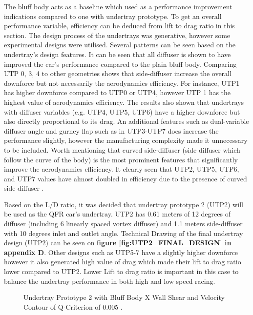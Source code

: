 \noindent The bluff body acts as a baseline which used as a performance improvement indications compared to one with undertray prototype. To get an overall performance variable, efficiency can be deduced from lift to drag ratio in this section. The design process of the undertrays was generative, however some experimental designs were utilised. Several patterns can be seen based on the undertray's design features. It can be seen that all diffuser is shown to have improved the car's performance compared to the plain bluff body. Comparing UTP 0, 3, 4 to other geometries shows that side-diffuser increase the overall downforce but not necessarily the aerodynamics efficiency. For instance, UTP1 has higher downforce compared to UTP0 or UTP4, however UTP 1 has the highest value of aerodynamics efficiency. The results also shown that undertrays with diffuser variables (e.g. UTP4, UTP5, UTP6) have a higher downforce but also directly proportional to its drag. An additional features such as dual-variable diffuser angle and gurney flap such as in UTP3-UTP7 does increase the performance slightly, however the manufacturing complexity made it unnecessary to be included.  Worth mentioning that curved side-diffuser (side diffuser which follow the curve of the body) is the most prominent features that significantly improve the aerodynamics efficiency. It clearly seen that UTP2, UTP5, UTP6, and UTP7 values have almost doubled in efficiency due to the presence of curved side diffuser .

\noindent Based on the L/D ratio, it was decided that undertray prototype 2 (UTP2) will be used as the QFR car's undertray. UTP2 has 0.61 meters of 12 degrees of diffuser (including 6 linearly spaced vortex diffuser) and 1.1 meters side-diffuser with 10 degrees inlet and outlet angle. Technical Drawing of the final undertray design (UTP2) can be seen on \textbf{figure \ref{fig:UTP2_FINAL_DESIGN} in appendix D}. Other designs such as UTP5-7  have a slightly higher downforce however it also generated high value of drag which made their lift to drag ratio lower compared to UTP2. Lower Lift to drag ratio is important in this case to balance the undertray performance in both high and low speed racing.

\begin{figure}[!htb] 
    \centering
    \noindent{}
    \caption{Undertray Prototype 2 with Bluff Body X Wall Shear and Velocity Contour of Q-Criterion of 0.005 .}
      \label{fig:3D_QCRIT_WSHEAR_UTP2}
\end{figure}

